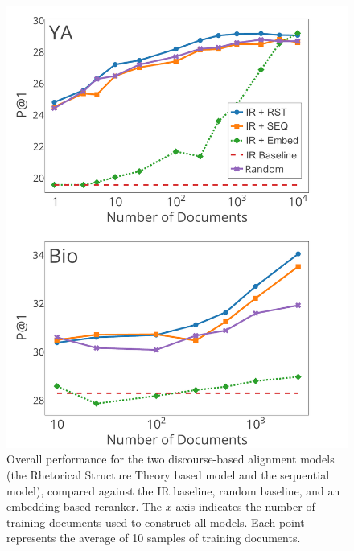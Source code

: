 \begin{figure}[t!]
\begin{center}
\includegraphics[width=120mm]{mainmatter/naacl2015-alignment/graphs_new2.pdf}
\caption{{\small Overall performance for the two discourse-based alignment models (the Rhetorical Structure Theory based model and the sequential model),
compared against the IR baseline, random baseline, and an embedding-based reranker.
The $x$ axis indicates the number of training documents used to construct all models. 
Each point represents the average of 10 samples of training documents.  }}
\label{fig:performance}
\end{center}
\end{figure}


